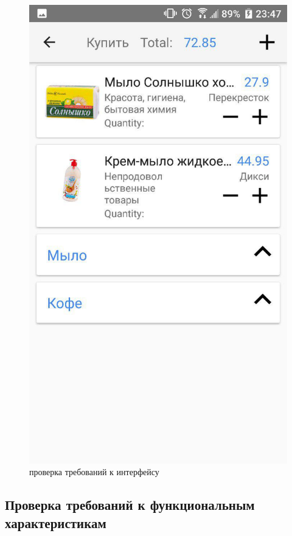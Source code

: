\begin{figure}[h!]
    \centering
    \includegraphics[height=0.48\textheight]{./screenshots/3/shoplist.jpg}
    \caption{проверка требований к интерфейсу}
    \label{interface}
\end{figure}

\newpage
\subsection{Проверка требований к функциональным характеристикам}

